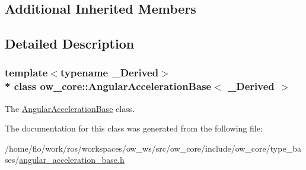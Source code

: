 \subsection*{Additional Inherited Members}


\subsection{Detailed Description}
\subsubsection*{template$<$typename \+\_\+\+Derived$>$\\*
class ow\+\_\+core\+::\+Angular\+Acceleration\+Base$<$ \+\_\+\+Derived $>$}

The \hyperlink{classow__core_1_1AngularAccelerationBase}{Angular\+Acceleration\+Base} class. 

The documentation for this class was generated from the following file\+:\begin{DoxyCompactItemize}
\item 
/home/flo/work/ros/workspaces/ow\+\_\+ws/src/ow\+\_\+core/include/ow\+\_\+core/type\+\_\+bases/\hyperlink{angular__acceleration__base_8h}{angular\+\_\+acceleration\+\_\+base.\+h}\end{DoxyCompactItemize}
